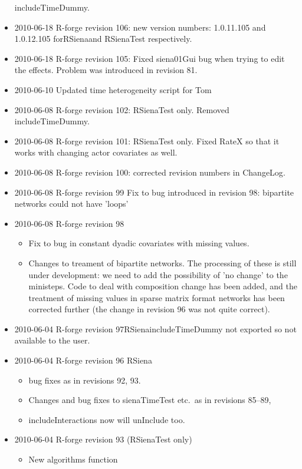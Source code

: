 \documentclass[a4paper,fleqn,11pt]{article}
\newcommand{\+}{\, + \,}
\newcommand{\sfn}[1]{\textsf{#1}}
\begin{document}
\begin{small}
\begin{itemize}
includeTimeDummy.
\item 2010-06-18 R-forge revision 106: new version numbers:
  1.0.11.105 and 1.0.12.105 for\textsf{RSiena}and \textsf{RSienaTest} respectively.
\item 2010-06-18 R-forge revision 105: Fixed siena01Gui bug when trying to edit
  the effects. Problem was introduced in revision 81.
\item 2010-06-10 Updated time heterogeneity script for Tom
\item 2010-06-08 R-forge revision 102: \textsf{RSienaTest} only. Removed
includeTimeDummy.
\item 2010-06-08 R-forge revision 101: \textsf{RSienaTest} only. Fixed RateX so that it
  works with changing actor covariates as well.
\item 2010-06-08 R-forge revision 100: corrected revision numbers in \sfn{ChangeLog}.
\item 2010-06-08 R-forge revision 99
Fix to bug introduced in revision 98: bipartite networks could not have 'loops'
\item 2010-06-08 R-forge revision 98
\begin{itemize}
\item Fix to bug in constant dyadic covariates with missing values.
\item Changes to treament of bipartite networks. The processing of these is
  still under development: we need to add the possibility of 'no change' to the
  ministeps. Code to deal with composition change has been added, and the
  treatment of missing values in sparse matrix format networks has been
  corrected further (the change in revision 96 was not quite correct).
\end{itemize}
\item 2010-06-04 R-forge revision 97\textsf{RSiena}includeTimeDummy not exported so not
  available to the user.
\item 2010-06-04 R-forge revision 96 RSiena
\begin{itemize}
\item bug fixes as in revisions 92, 93.
\item Changes and bug fixes to \textsf{sienaTimeTest} etc.\ as in revisions 85--89,
\item \sfn{includeInteractions} now will unInclude too.
\end{itemize}
\item 2010-06-04 R-forge revision 93 (RSienaTest only)
\begin{itemize}\item New algorithms function

\end{itemize}
\end{itemize}
\end{small}
\end{document}

